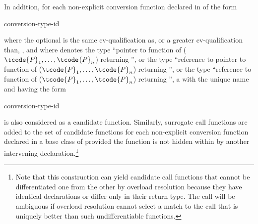 \pnum
In addition, for each non-explicit conversion function declared in  of the
form
\begin{ncsimplebnf}
 conversion-type-id \terminal{(\,)}     \terminal{;}
\end{ncsimplebnf}
where the optional
is the same cv-qualification as, or a greater cv-qualification than,
\cv{},
and where
denotes the type ``pointer to function
of ($\tcode{P}_1, \dotsc, \tcode{P}_n$) returning '',
or the type ``reference to pointer to function
of ($\tcode{P}_1, \dotsc, \tcode{P}_n$) returning '',
or the type
``reference to function of ($\tcode{P}_1, \dotsc, \tcode{P}_n$)
returning '', a  with the unique name
and having the form
\begin{ncbnf}
  \terminal{(} conversion-type-id \ %
 
\end{ncbnf}
is also considered as a candidate function.
Similarly, surrogate
call functions are added to the set of candidate functions for
each non-explicit conversion function declared in a base class of
provided the function is not hidden within
by another
intervening declaration.\footnote{Note that this construction can yield
candidate call functions that cannot be
differentiated one from the other by overload resolution because they have
identical
declarations or differ only in their return type.
The call will be ambiguous
if overload
resolution cannot select a match to the call that is uniquely better than such
undifferentiable functions.}


